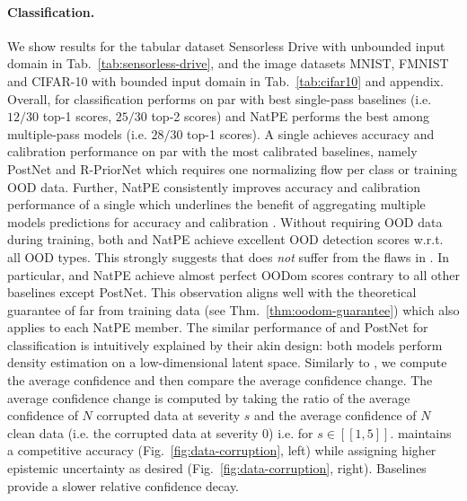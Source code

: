 \paragraph{Classification.} We show results for the tabular dataset Sensorless Drive with unbounded input domain in Tab.~\ref{tab:sensorless-drive}, and the image datasets MNIST, FMNIST and CIFAR-10 with bounded input domain in Tab.~\ref{tab:cifar10} and appendix. Overall, for classification \NatPNacro{} performs on par with best single-pass baselines (i.e. $12/30$ top-1 scores, $25/30$ top-2 scores) and NatPE performs the best among multiple-pass models (i.e. $28/30$ top-1 scores). A single \NatPNacro{} achieves accuracy and calibration performance on par with the most calibrated baselines, namely PostNet and R-PriorNet which requires one normalizing flow per class or training OOD data. Further, NatPE consistently improves accuracy and calibration performance of a single \NatPNacro{} which underlines the benefit of aggregating multiple models predictions for accuracy and calibration \citep{ensembles}. Without requiring OOD data during training, both \NatPNacro{} and NatPE achieve excellent OOD detection scores w.r.t. all OOD types. This strongly suggests that \NatPNacro{} does \emph{not} suffer from the flaws in \cite{anomaly-detection,deep-generative,typicality_OOD_generative}. In particular, \NatPNacro{} and NatPE achieve almost perfect OODom scores contrary to all other baselines except PostNet. This observation aligns well with the theoretical guarantee of \NatPNacro{} far from training data (see Thm.~\ref{thm:oodom-guarantee}) which also applies to each NatPE member. The similar performance of \NatPNacro{} and PostNet for classification is intuitively explained by their akin design: both models perform density estimation on a low-dimensional latent space. Similarly to \cite{postnet}, we compute the average confidence  and then compare the average confidence change. The average confidence change is computed by taking the ratio of the average confidence of $N$ corrupted data at severity $s$ and the average confidence of $N$ clean data (i.e. the corrupted data at severity $0$) i.e.  for $s \in [\![ 1, 5 ]\!]$. \NatPNacro{} maintains a competitive accuracy (Fig.~\ref{fig:data-corruption}, left) while assigning higher epistemic uncertainty as desired (Fig.~\ref{fig:data-corruption}, right). Baselines provide a slower relative confidence decay.

